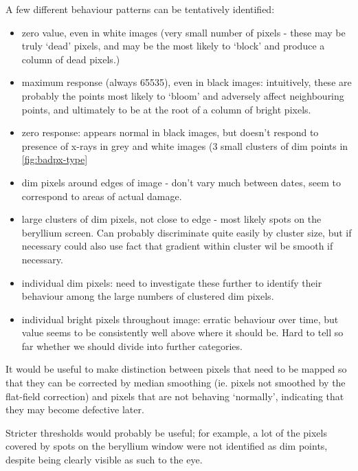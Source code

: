 \documentclass[10pt,fleqn]{article}
\begin{document}
A few different behaviour patterns can be tentatively identified:
\begin{itemize}

\item zero value, even in white images (very small number of pixels - these may be truly `dead' pixels, and may be the most likely to `block' and produce a column of dead pixels.)

\item maximum response (always 65535), even in black images: intuitively, these are probably the points most likely to `bloom' and adversely affect neighbouring points, and ultimately to be at the root of a column of bright pixels.

\item zero response: appears normal in black images, but doesn't respond to presence of x-rays in grey and white images (3 small clusters of dim points in \autoref{fig:badpx-type}

\item dim pixels around edges of image - don't vary much between dates, seem to correspond to areas of actual damage.

\item large clusters of dim pixels, not close to edge - most likely spots on the beryllium screen. Can probably discriminate quite easily by cluster size, but if necessary could also use fact that gradient within cluster wil be smooth if necessary.

\item individual dim pixels: need to investigate these further to identify their behaviour among the large numbers of clustered dim pixels. 

\item individual bright pixels throughout image: erratic behaviour over time, but value seems to be consistently well above where it should be. Hard to tell so far whether we should divide into further categories.
\end{itemize}

It would be useful to make distinction between pixels that need to be mapped so that they can be corrected by median smoothing (ie. pixels not smoothed by the flat-field correction) and pixels that are not behaving `normally', indicating that they may become defective later.

Stricter thresholds would probably be useful; for example, a lot of the pixels covered by spots on the beryllium window were not identified as dim points, despite being clearly visible as such to the eye.
\end{document}
